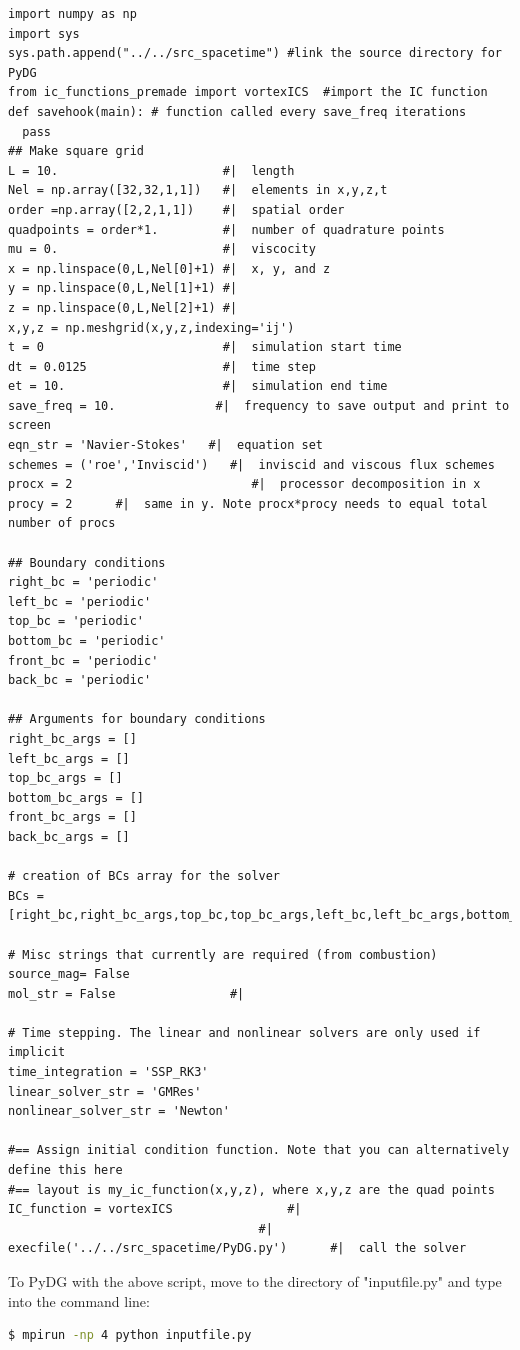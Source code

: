\documentclass[times,12pt]{article}%
\begin{document}
\begin{lstlisting}
import numpy as np
import sys
sys.path.append("../../src_spacetime") #link the source directory for PyDG
from ic_functions_premade import vortexICS  #import the IC function
def savehook(main): # function called every save_freq iterations
  pass
## Make square grid
L = 10.                       #|  length
Nel = np.array([32,32,1,1])   #|  elements in x,y,z,t
order =np.array([2,2,1,1])    #|  spatial order
quadpoints = order*1.         #|  number of quadrature points
mu = 0.                       #|  viscocity
x = np.linspace(0,L,Nel[0]+1) #|  x, y, and z
y = np.linspace(0,L,Nel[1]+1) #|
z = np.linspace(0,L,Nel[2]+1) #|
x,y,z = np.meshgrid(x,y,z,indexing='ij')
t = 0                         #|  simulation start time
dt = 0.0125                   #|  time step
et = 10.                      #|  simulation end time
save_freq = 10.              #|  frequency to save output and print to screen
eqn_str = 'Navier-Stokes'   #|  equation set
schemes = ('roe','Inviscid')   #|  inviscid and viscous flux schemes
procx = 2                         #|  processor decomposition in x
procy = 2      #|  same in y. Note procx*procy needs to equal total number of procs

## Boundary conditions
right_bc = 'periodic' 
left_bc = 'periodic'
top_bc = 'periodic'
bottom_bc = 'periodic'
front_bc = 'periodic'
back_bc = 'periodic'

## Arguments for boundary conditions
right_bc_args = []
left_bc_args = []
top_bc_args = []
bottom_bc_args = []
front_bc_args = []
back_bc_args = []

# creation of BCs array for the solver
BCs = [right_bc,right_bc_args,top_bc,top_bc_args,left_bc,left_bc_args,bottom_bc,bottom_bc_args,front_bc,front_bc_args,back_bc,back_bc_args]

# Misc strings that currently are required (from combustion)
source_mag= False
mol_str = False				   #|

# Time stepping. The linear and nonlinear solvers are only used if implicit
time_integration = 'SSP_RK3'
linear_solver_str = 'GMRes'
nonlinear_solver_str = 'Newton'

#== Assign initial condition function. Note that you can alternatively define this here
#== layout is my_ic_function(x,y,z), where x,y,z are the quad points
IC_function = vortexICS                #|
                                   #|
execfile('../../src_spacetime/PyDG.py')      #|  call the solver
\end{lstlisting}
\noindent To PyDG with the above script, move to the directory of "inputfile.py" and type into the command line:
\begin{lstlisting}[language=bash]
  $ mpirun -np 4 python inputfile.py
\end{lstlisting}
\end{document}
